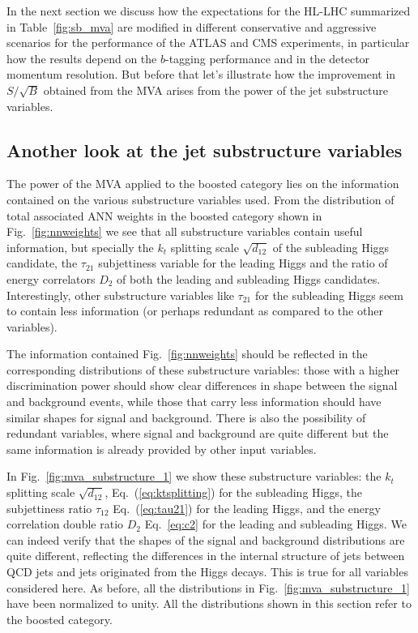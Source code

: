 In the next section we discuss how the expectations for the HL-LHC
summarized in  Table~\ref{fig:sb_mva} are modified in different
conservative and aggressive scenarios for the performance of the
ATLAS and CMS experiments, in particular how the results depend
on the $b$-tagging performance and in the detector momentum
resolution.
%
But before that let's illustrate how the improvement in $S/\sqrt{B}$
obtained from the MVA arises from the power of the jet
substructure variables.

\subsection{Another look at the jet substructure variables}

The power of the MVA applied to the boosted category lies
on the information contained on the various substructure variables
used.
%
From the distribution of total associated ANN weights in the
boosted category shown in Fig.~\ref{fig:nnweights} we see that
all substructure variables contain useful information,
but specially the $k_t$ splitting scale $\sqrt{d_{12}}$ of the
subleading Higgs candidate, the $\tau_{21}$ subjettiness variable for
the leading Higgs
and the ratio of energy correlators $D_2$ of both the leading
and subleading Higgs candidates.
%
Interestingly, other substructure variables like $\tau_{21}$ for
the subleading Higgs seem to contain less information (or perhaps
redundant as compared to the other variables).


The information contained Fig.~\ref{fig:nnweights} should be
reflected in the corresponding distributions of these substructure
variables: those with a higher discrimination power should show
clear differences in shape between the signal and background events,
while those that carry less information should have similar
shapes for signal and background.
%
There is also the possibility of redundant variables, where signal
and background are quite different but the same information
is already provided by other input variables.

In Fig.~\ref{fig:mva_substructure_1}
we show these substructure variables: the
$k_t$ splitting scale $\sqrt{d_{12}}$, Eq.~(\ref{eq:ktsplitting}) for
the subleading Higgs, the subjettiness ratio $\tau_{12}$
Eq.~(\ref{eq:tau21})
for the leading Higgs,
and the energy correlation double ratio $D_2$
Eq.~\ref{eq:c2}
for the leading and subleading Higgs.
%
We can indeed verify that the shapes of the signal
and background distributions are quite different,
reflecting the differences in the internal structure of jets
between QCD jets and jets originated from the Higgs decays.
%
This is true for all variables considered here.
%
As before, all the distributions in
Fig.~\ref{fig:mva_substructure_1}
have been normalized to unity.
%
All the distributions shown in this section refer to the boosted category.


